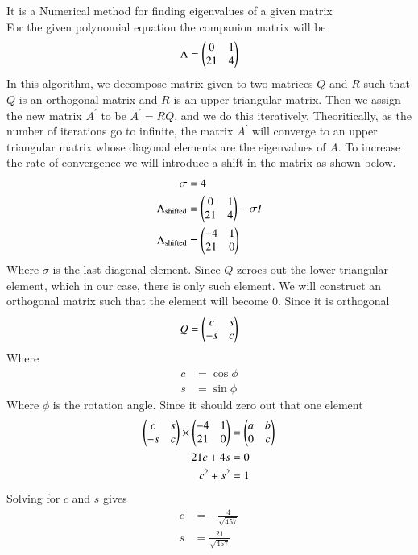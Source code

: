 \documentclass[journal]{IEEEtran}
\begin{document}
	It is a Numerical method for finding eigenvalues of a given matrix\\
	For the given polynomial equation the companion matrix will be
	\begin{align}
		\Lambda = \begin{pmatrix}0 & 1\\21 & 4\end{pmatrix}
	\end{align}
	In this algorithm, we decompose matrix given to two matrices $Q$ and $R$ such that $Q$ is an orthogonal matrix and $R$ is an upper triangular matrix. Then we assign the new matrix $A^\prime$ to be $A^\prime = RQ$, and we do this iteratively. Theoritically, as the number of iterations go to infinite, the matrix $A^\prime$ will converge to an upper triangular matrix whose diagonal elements are the eigenvalues of $A$.
	To increase the rate of convergence we will introduce a shift in the matrix as shown below.
	\begin{align}
		\sigma &= 4\\
		\Lambda_{\text{shifted}} &= \begin{pmatrix}0 & 1\\21 & 4\end{pmatrix} - \sigma I\\
		\Lambda_{\text{shifted}} &= \begin{pmatrix}-4 & 1\\ 21 & 0\end{pmatrix}
	\end{align}
	Where $\sigma$ is the last diagonal element. Since $Q$ zeroes out the lower triangular element, which in our case, there is only such element. We will construct an orthogonal matrix such that the element will become 0. Since it is orthogonal
	\begin{align}
		Q &= \begin{pmatrix}c & s\\-s & c\end{pmatrix}\\
	\end{align}
	Where
	\begin{align}
		c &= \cos{\phi}\\
		s &= \sin{\phi}
	\end{align}
	Where $\phi$ is the rotation angle. Since it should zero out that one element\\
	\begin{align}
		\begin{pmatrix}c & s\\-s & c\end{pmatrix} \times \begin{pmatrix}-4 & 1\\ 21 & 0\end{pmatrix} &= \begin{pmatrix}a & b\\ 0 & c\end{pmatrix}\\
		21c + 4s &= 0\\
		c^2+s^2 &= 1
	\end{align}
	Solving for $c$ and $s$ gives
	\begin{align}
		c &= - \frac{4}{\sqrt{457}}\\
		s &=  \frac{21}{\sqrt{457}}
	\end{align}
\end{document}

